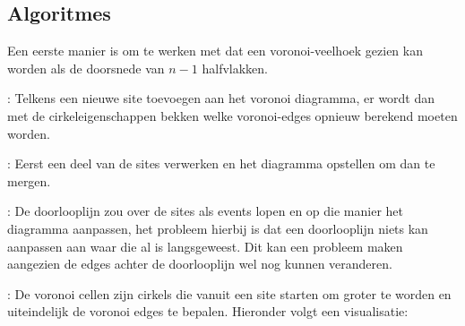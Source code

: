 \documentclass[12pt,a4paper]{article}
\begin{document}
	\subsection{Algoritmes}
	\begin{description}
		\item Een eerste manier is om te werken met dat een voronoi-veelhoek gezien kan worden als de doorsnede van $n-1$ halfvlakken. 
		\item[Incrementeel algoritme]: Telkens een nieuwe site toevoegen aan het voronoi diagramma, er wordt dan met de cirkeleigenschappen bekken welke voronoi-edges opnieuw berekend moeten worden. 
		\item[Verdeel-en-heers algoritme]: Eerst een deel van de sites verwerken en het diagramma opstellen om dan te mergen. 
		\item[Doorlooplijn]: De doorlooplijn zou over de sites als events lopen en op die manier het diagramma aanpassen, het probleem hierbij is dat een doorlooplijn niets kan aanpassen aan waar die al is langsgeweest. Dit kan een probleem maken aangezien de edges achter de doorlooplijn wel nog kunnen veranderen. 
		\item[Groeiende cirkels]: De voronoi cellen zijn cirkels die vanuit een site starten om groter te worden en uiteindelijk de voronoi edges te bepalen. Hieronder volgt een visualisatie: 
		\begin{figure}[h]
			\centering

\end{figure}
\end{description}
\end{document}
